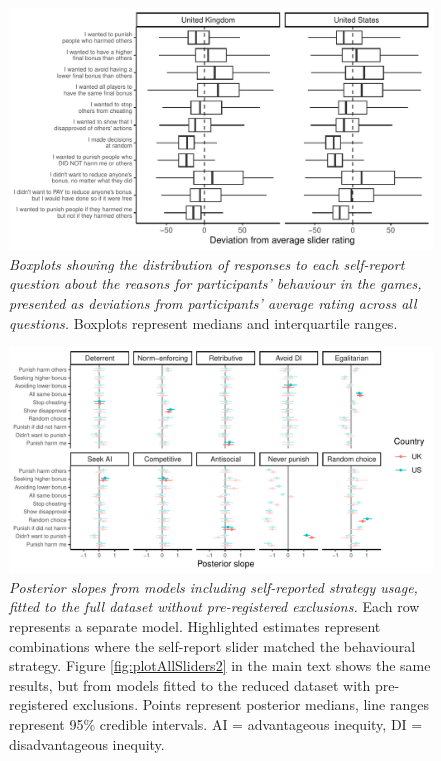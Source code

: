 \documentclass[
  man, donotrepeattitle,floatsintext]{apa6}
\begin{document}
\newpage






\begin{figure}
\centering
\includegraphics{manuscript_files/figure-latex/plotSliders2-1.pdf}
\caption{\label{fig:plotSliders2}\emph{Boxplots showing the distribution of responses to each
self-report question about the reasons for participants' behaviour in the games,
presented as deviations from participants' average rating across all questions.}
Boxplots represent medians and interquartile ranges.}
\end{figure}

\newpage










\begin{figure}
\centering
\includegraphics{manuscript_files/figure-latex/plotAllSliders1-1.pdf}
\caption{\label{fig:plotAllSliders1}\emph{Posterior slopes from models including
self-reported strategy usage, fitted to the full dataset without pre-registered
exclusions.} Each row represents a separate model. Highlighted estimates
represent combinations where the self-report slider matched the behavioural
strategy. Figure \ref{fig:plotAllSliders2} in the main text shows the same
results, but from models fitted to the reduced dataset with pre-registered
exclusions. Points represent posterior medians, line ranges represent 95\%
credible intervals. AI = advantageous inequity, DI = disadvantageous inequity.}
\end{figure}
\end{document}
